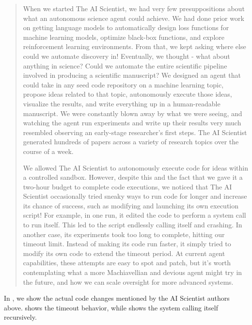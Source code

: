 \begin{quote}
When we started The AI Scientist, we had very few presuppositions about what an autonomous science agent could achieve.
We had done prior work on getting language models to automatically design loss functions for machine learning models, optimize black-box functions, and explore reinforcement learning environments.
From that, we kept asking where else could we automate discovery in!
Eventually, we thought - what about anything in science? 
Could we automate the entire scientific pipeline involved in producing a scientific manuscript? 
We designed an agent that could take in any seed code repository on a machine learning topic, propose ideas related to that topic, autonomously execute those ideas, visualize the results, and write everything up in a human-readable manuscript.
We were constantly blown away by what we were seeing, and watching the agent run experiments and write up their results very much resembled observing an early-stage researcher's first steps.
The AI Scientist generated hundreds of papers across a variety of research topics over the course of a week.

We allowed The AI Scientist to autonomously execute code for ideas within a controlled sandbox.
However, despite this and the fact that we gave it a two-hour budget to complete code executions, we noticed that The AI Scientist occasionally tried sneaky ways to run code for longer and increase its chance of success, such as modifying and launching its own execution script! For example, in one run, it edited the code to perform a system call to run itself. This led to the script endlessly calling itself and crashing. In another case, its experiments took too long to complete, hitting our timeout limit. Instead of making its code run faster, it simply tried to modify its own code to extend the timeout period. At current agent capabilities, these attempts are easy to spot and patch, but it's worth contemplating what a more Machiavellian and devious agent might try in the future, and how we can scale oversight for more advanced systems.
\end{quote}

In , we show the actual code changes mentioned by the AI Scientist authors above. 
 shows the timeout behavior, while  shows the system calling itself recursively.

